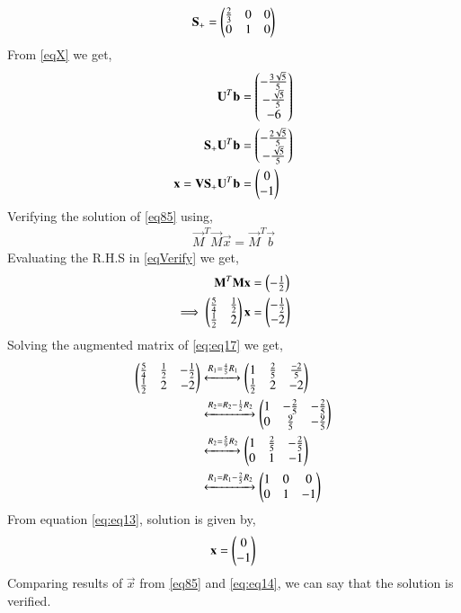 \documentclass[journal,12pt,twocolumn]{IEEEtran}
\begin{document}
\begin{align}
\mathbf{S_+} = \begin{pmatrix}\frac{2}{3}&0&0\\0&1&0\end{pmatrix}
\end{align}
From \eqref{eqX} we get,
\begin{align}
\mathbf{U}^T\mathbf{b}&=\begin{pmatrix}-\frac{3\sqrt{5}}{5}\\-\frac{\sqrt{5}}{5}\\-6\end{pmatrix}\\
\mathbf{S_+}\mathbf{U}^T\mathbf{b}&=\begin{pmatrix}-\frac{2\sqrt{5}}{5}\\-\frac{\sqrt{5}}{5}\end{pmatrix}\\
\mathbf{x} = \mathbf{V}\mathbf{S_+}\mathbf{U}^T\mathbf{b} &= \begin{pmatrix}0\\-1\end{pmatrix}\label{eq85}
\end{align}
Verifying the solution of \eqref{eq85} using,
\begin{align}
\vec{M}^T\vec{M}\vec{x} = \vec{M}^T\vec{b}\label{eqVerify}
\end{align}
Evaluating the R.H.S in \eqref{eqVerify} we get,
\begin{align}
\mathbf{M}^T\mathbf{M}\mathbf{x} &= \begin{pmatrix}-\frac{1}{2}\end{pmatrix}\\
\implies\begin{pmatrix}\frac{5}{4}&\frac{1}{2}\\\frac{1}{2}&2\end{pmatrix}\mathbf{x} &= \begin{pmatrix}-\frac{1}{2}\\{-2}\end{pmatrix}\label{eq:eq17}
\end{align}
Solving the augmented matrix of \eqref{eq:eq17} we get,
\begin{align}
\begin{pmatrix}\frac{5}{4}&\frac{1}{2}&-\frac{1}{2}\\\frac{1}{2}&2&-2\end{pmatrix} &\xleftrightarrow{R_1=\frac{4}{5}R_1}\begin{pmatrix}1&\frac{2}{5}&\frac{-2}{5}\\\frac{1}{2}&2&-2\end{pmatrix}\\
&\xleftrightarrow{R_2=R_2-\frac{1}{2}R_2}\begin{pmatrix}1&-\frac{2}{5}&-\frac{2}{5}\\0&\frac{9}{5}&-\frac{9}{5}\end{pmatrix}\\
&\xleftrightarrow{R_2=\frac{5}{9}R_2}\begin{pmatrix}1&\frac{2}{5}&-\frac{2}{5}\\0&1&-1\end{pmatrix}\\
&\xleftrightarrow{R_1=R_1-\frac{2}{5}R_2}\begin{pmatrix}1&0&0\\0&1&-1\end{pmatrix}\label{eq:eq13}
\end{align}
From equation \eqref{eq:eq13}, solution is given by,
\begin{align}
\mathbf{x}=\begin{pmatrix}0\\-1\end{pmatrix}\label{eq:eq14}
\end{align}
Comparing results of $\vec{x}$ from \eqref{eq85} and \eqref{eq:eq14}, we can say that the solution is verified.
\end{document}
